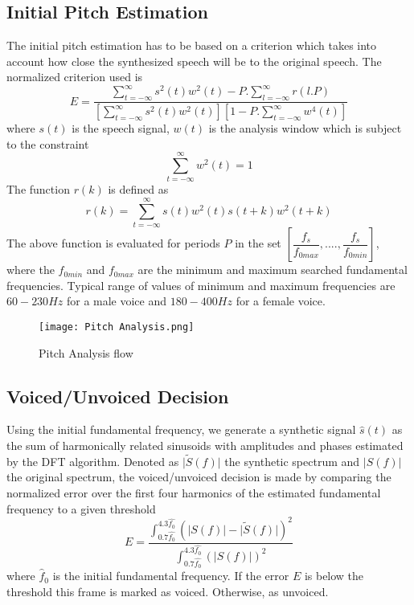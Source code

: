 \documentclass[BTech]{nitkdiss}
\begin{document}
\subsection{Initial Pitch Estimation}
The initial pitch estimation has to be based on a criterion which takes into account how close the synthesized speech will be to the original speech. The normalized criterion used is $$E=\dfrac{\sum_{t=-\infty}^{\infty}s^{2}(t)w^{2}(t)-P.\sum_{l=-\infty}^{\infty}r(l.P)}{[\sum_{t=-\infty}^{\infty}s^{2}(t)w^{2}(t)][1-P.\sum_{t=-\infty}^{\infty}w^{4}(t)]}$$ where $s(t)$ is the speech signal, $w(t)$ is the analysis window which is subject to the constraint $$\sum_{t=-\infty}^{\infty}w^{2}(t)=1$$ The function $r(k)$ is defined as $$r(k)=\sum_{t=-\infty}^{\infty}s(t)w^{2}(t)s(t+k)w^{2}(t+k)$$ The above function is evaluated for periods $P$ in the set $[\dfrac{f_{s}}{f_{0max}},....,\dfrac{f_{s}}{f_{0min}}]$, where the $f_{0min}$ and $f_{0max}$ are the minimum and maximum searched fundamental frequencies. Typical range of values of minimum and maximum frequencies are $60 - 230 Hz$ for a male voice and $180 - 400 Hz$ for a female voice.

\begin{figure}[H]
\centering
\texttt{[image: Pitch Analysis.png]}
\caption{Pitch Analysis flow}
\label{Figure 1}
\end{figure}

\subsection{Voiced/Unvoiced Decision}

Using the initial fundamental frequency, we generate a synthetic signal $\hat{s}(t)$ as the sum of harmonically related sinusoids with amplitudes and phases estimated by the DFT algorithm. Denoted as $\lvert \tilde{S}(f)\rvert$ the synthetic spectrum and $\lvert S(f)\rvert$ the original spectrum, the voiced/unvoiced decision is made by comparing the normalized error over the first four harmonics of the estimated fundamental frequency to a given threshold $$E=\dfrac{\int_{0.7\hat{f_{0}}}^{4.3\hat{f_{0}}}(\lvert S(f)\rvert-\lvert \tilde{S}(f)\rvert)^2}{\int_{0.7\hat{f_{0}}}^{4.3\hat{f_{0}}}(\lvert S(f)\rvert)^2}$$ where $\hat{f}_{0}$ is the initial fundamental frequency. If the error $E$ is below the threshold this frame is marked as voiced. Otherwise, as unvoiced.
\end{document}
